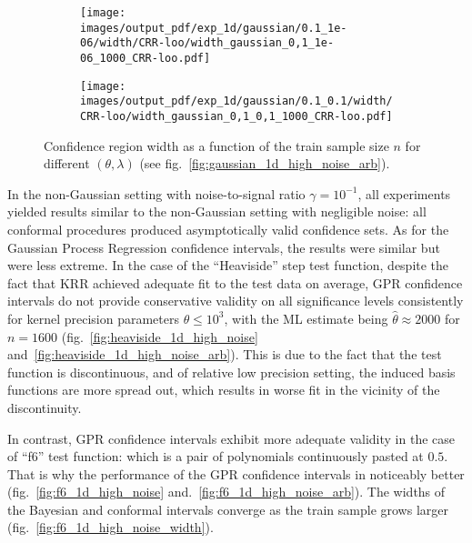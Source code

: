 \documentclass[a4paper,14pt]{extarticle}
\begin{document}
\begin{figure}
\begin{subfigure}[b]{0.25\linewidth}
  \end{subfigure}%
  \begin{subfigure}[b]{0.25\linewidth}
    \texttt{[image: images/output\_pdf/exp\_1d/gaussian/0.1\_1e-06/width/CRR-loo/width\_gaussian\_0,1\_1e-06\_1000\_CRR-loo.pdf]}
    \caption{} \label{fig:gaussian_1d_high_noise_arb_width_c3}
  \end{subfigure}%
  \begin{subfigure}[b]{0.25\linewidth}
    \texttt{[image: images/output\_pdf/exp\_1d/gaussian/0.1\_0.1/width/CRR-loo/width\_gaussian\_0,1\_0,1\_1000\_CRR-loo.pdf]}
    \caption{} \label{fig:gaussian_1d_high_noise_arb_width_c4}
  \end{subfigure}
  \caption{Confidence region width as a function of the train sample size $n$ for
  different $(\theta, \lambda)$ (see fig.~\ref{fig:gaussian_1d_high_noise_arb}).}
  \label{fig:gaussian_1d_high_noise_arb_width}
\end{figure}

In the non-Gaussian setting with noise-to-signal ratio $\gamma=10^{-1}$, all experiments
yielded results similar to the non-Gaussian setting with negligible noise: all conformal
procedures produced asymptotically valid confidence sets. As for the Gaussian Process
Regression confidence intervals, the results were similar but were less extreme.
In the case of the ``Heaviside'' step test function, despite the fact that KRR achieved
adequate fit to the test data on average, GPR confidence intervals do not provide
conservative validity on all significance levels consistently for kernel precision
parameters $\theta \leq 10^3$, with the ML estimate being $\hat{\theta}\approx 2000$
for $n=1600$ (fig.~\ref{fig:heaviside_1d_high_noise} and~\ref{fig:heaviside_1d_high_noise_arb}).
This is due to the fact that the test function is discontinuous, and of relative
low precision setting, the induced basis functions are more spread out, which results
in worse fit in the vicinity of the discontinuity.

In contrast, GPR confidence intervals exhibit more adequate validity in the case
of ``f6'' test function: which is a pair of polynomials continuously pasted at $0.5$.
That is why the performance of the GPR confidence intervals in noticeably better
(fig.~\ref{fig:f6_1d_high_noise} and.~\ref{fig:f6_1d_high_noise_arb}). The widths
of the Bayesian and conformal intervals converge as the train sample grows larger
(fig.~\ref{fig:f6_1d_high_noise_width}).
\end{document}
